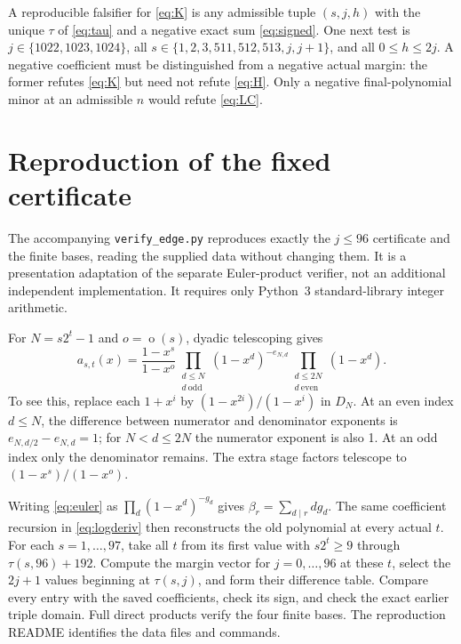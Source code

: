 \documentclass[11pt]{article}
\DeclareMathOperator{\odd}{o}
\begin{document}
A reproducible falsifier for \eqref{eq:K} is any admissible tuple
$(s,j,h)$ with the unique $\tau$ of \eqref{eq:tau} and a negative exact
sum \eqref{eq:signed}. One next test is
$j\in\{1022,1023,1024\}$, all
$s\in\{1,2,3,511,512,513,j,j+1\}$, and all $0\leq h\leq2j$.
A negative coefficient must be distinguished from a negative actual
margin: the former refutes \eqref{eq:K} but need not refute
\eqref{eq:H}. Only a negative final-polynomial minor at an admissible
$n$ would refute \eqref{eq:LC}.

\appendix
\section{Reproduction of the fixed certificate}\label{app:reproduction}

The accompanying \texttt{verify\_edge.py} reproduces exactly the
$j\leq96$ certificate and the finite bases, reading the supplied data
without changing them. It is a presentation adaptation of the separate
Euler-product verifier, not an additional independent implementation.
It requires only Python~3 standard-library integer arithmetic.

For $N=s2^t-1$ and $o=\odd(s)$, dyadic telescoping gives
\begin{equation}\label{eq:euler}
 a_{s,t}(x)=\frac{1-x^s}{1-x^o}
 \prod_{\substack{d\leq N\\d\ \mathrm{odd}}}
       (1-x^d)^{-e_{N,d}}
 \prod_{\substack{d\leq2N\\d\ \mathrm{even}}}(1-x^d).
\end{equation}
To see this, replace each $1+x^i$ by $(1-x^{2i})/(1-x^i)$ in $D_N$.
At an even index $d\leq N$, the difference between numerator and
denominator exponents is $e_{N,d/2}-e_{N,d}=1$; for
$N<d\leq2N$ the numerator exponent is also 1. At an odd index only
the denominator remains. The extra stage factors telescope to
$(1-x^s)/(1-x^o)$.

Writing \eqref{eq:euler} as $\prod_d(1-x^d)^{-g_d}$ gives
$\beta_r=\sum_{d\mid r}d g_d$. The same coefficient recursion in
\eqref{eq:logderiv} then reconstructs the old polynomial at every
actual $t$. For each $s=1,\ldots,97$, take all $t$ from its first value
with $s2^t\geq9$ through $\tau(s,96)+192$. Compute the margin vector
for $j=0,\ldots,96$ at these $t$, select the $2j+1$ values beginning at
$\tau(s,j)$, and form their difference table. Compare every entry with
the saved coefficients, check its sign, and check the exact earlier
triple domain. Full direct products verify the four finite bases.
The reproduction README identifies the data files and commands.
\end{document}
